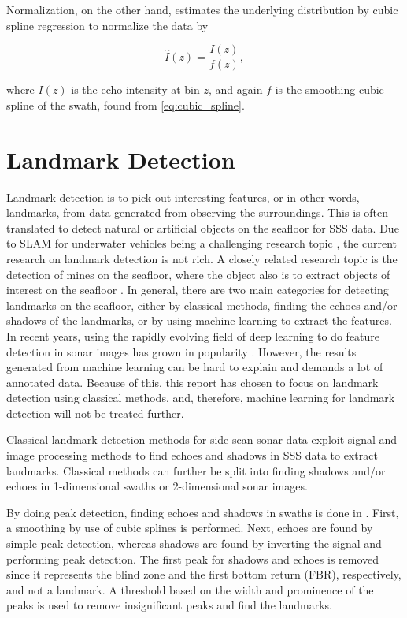 Normalization, on the other hand, estimates the underlying distribution by cubic spline regression to normalize the data by

\begin{equation}
    \hat{I}(z) = \frac{I(z)}{f(z)},
    \label{eq:swath_norm}
\end{equation}

where $I(z)$ is the echo intensity at bin $z$, and again $f$ is the smoothing cubic spline of the swath, found from \cref{eq:cubic_spline}.

\section{Landmark Detection}

Landmark detection is to pick out interesting features, or in other words, landmarks, from data generated from observing the surroundings. This is often translated to detect natural or artificial objects on the seafloor for SSS data. Due to SLAM for underwater vehicles being a challenging research topic \cite{Hidalgo2015ReviewTechniques}, the current research on landmark detection is not rich. A closely related research topic is the detection of mines on the seafloor, where the object also is to extract objects of interest on the seafloor \cite{Picard2016DetectionDimensionality}. In general, there are two main categories for detecting landmarks on the seafloor, either by classical methods, finding the echoes and/or shadows of the landmarks, or by using machine learning to extract the features. In recent years, using the rapidly evolving field of deep learning to do feature detection in sonar images has grown in popularity \cite{Wang2020ImageSonar, Zhou2022NonlinearFeatures}. However, the results generated from machine learning can be hard to explain and demands a lot of annotated data. Because of this, this report has chosen to focus on landmark detection using classical methods, and, therefore, machine learning for landmark detection will not be treated further.

Classical landmark detection methods for side scan sonar data exploit signal and image processing methods to find echoes and shadows in SSS data to extract landmarks. Classical methods can further be split into finding shadows and/or echoes in 1-dimensional swaths or 2-dimensional sonar images.

By doing peak detection, finding echoes and shadows in swaths is done in \cite{Al-Rawi2017LandmarkImages}. First, a smoothing by use of cubic splines is performed. Next, echoes are found by simple peak detection, whereas shadows are found by inverting the signal and performing peak detection. The first peak for shadows and echoes is removed since it represents the blind zone and the first bottom return (FBR), respectively, and not a landmark. A threshold based on the width and prominence of the peaks is used to remove insignificant peaks and find the landmarks.  

